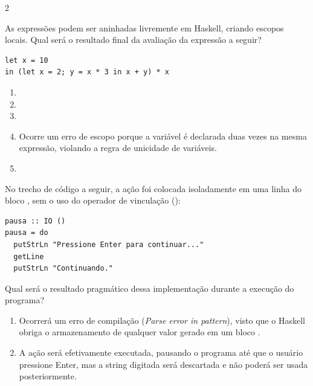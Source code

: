 \documentclass[a4paper,10pt,brazil]{article}
\begin{document}
\begin{multicols}{2}
\begin{enumerate}
\end{enumerate}

As expressões  podem ser aninhadas livremente em Haskell, criando escopos locais. Qual será o resultado final da avaliação da expressão a seguir?
\begin{verbatim}
let x = 10 
in (let x = 2; y = x * 3 in x + y) * x
\end{verbatim}

\begin{enumerate}
  \item {}

  \item {}

  \item {}

  \item Ocorre um erro de escopo porque a variável  é declarada duas vezes na mesma expressão, violando a regra de unicidade de variáveis.

  \item {}


\end{enumerate}

No trecho de código a seguir, a ação  foi colocada isoladamente em uma linha do bloco , sem o uso do operador de vinculação (\haskellinline{<-}):

\begin{verbatim}
pausa :: IO ()
pausa = do
  putStrLn "Pressione Enter para continuar..."
  getLine
  putStrLn "Continuando."
\end{verbatim}

Qual será o resultado pragmático dessa implementação durante a execução do programa?

\begin{enumerate}
  \item Ocorrerá um erro de compilação (\emph{Parse error in pattern}), visto que o Haskell obriga o armazenamento de qualquer valor gerado em um bloco .

  \item A ação  será efetivamente executada, pausando o programa até que o usuário pressione Enter, mas a string digitada será descartada e não poderá ser usada posteriormente.


\end{enumerate}
\end{multicols}
\end{document}
